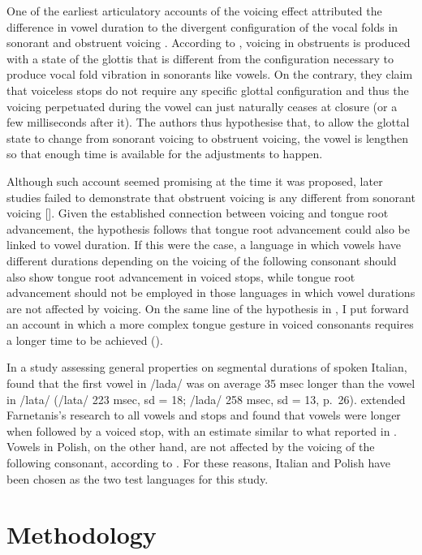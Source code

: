\documentclass[authoryear, twocolumn]{elsarticle}
\begin{document}
One of the earliest articulatory accounts of the voicing effect
attributed the difference in vowel duration to the divergent
configuration of the vocal folds in sonorant and obstruent voicing
\citetext{\citealp{halle1967}; \citealp[reiterated in][]{chomsky1968}}.
According to \citet{halle1967}, voicing in obstruents is produced with a
state of the glottis that is different from the configuration necessary
to produce vocal fold vibration in sonorants like vowels. On the
contrary, they claim that voiceless stops do not require any specific
glottal configuration and thus the voicing perpetuated during the vowel
can just naturally ceases at closure (or a few milliseconds after it).
The authors thus hypothesise that, to allow the glottal state to change
from sonorant voicing to obstruent voicing, the vowel is lengthen so
that enough time is available for the adjustments to happen.

Although such account seemed promising at the time it was proposed,
later studies failed to demonstrate that obstruent voicing is any
different from sonorant voicing {[}{]}. Given the established connection
between voicing and tongue root advancement, the hypothesis follows that
tongue root advancement could also be linked to vowel duration. If this
were the case, a language in which vowels have different durations
depending on the voicing of the following consonant should also show
tongue root advancement in voiced stops, while tongue root advancement
should not be employed in those languages in which vowel durations are
not affected by voicing. On the same line of the hypothesis in
\citet{halle1967}, I put forward an account in which a more complex
tongue gesture in voiced consonants requires a longer time to be
achieved ().

In a study assessing general properties on segmental durations of spoken
Italian, \citet{farnetani1986} found that the first vowel in /lada/ was
on average 35 msec longer than the vowel in /lata/ (/lata/ 223 msec, sd
= 18; /lada/ 258 msec, sd = 13, p.~26). \citet{esposito2002} extended
Farnetanis's research to all vowels and stops and found that vowels were
longer when followed by a voiced stop, with an estimate similar to what
reported in \citet{farnetani1986}. Vowels in Polish, on the other hand,
are not affected by the voicing of the following consonant, according to
\citet{keating1984}. For these reasons, Italian and Polish have been
chosen as the two test languages for this study.

\section{Methodology}\label{methodology}
\end{document}
